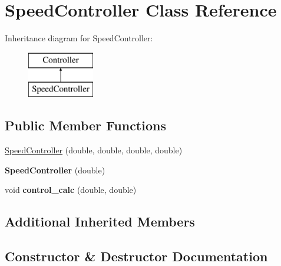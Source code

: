 \hypertarget{class_speed_controller}{}\section{Speed\+Controller Class Reference}
\label{class_speed_controller}
Inheritance diagram for Speed\+Controller\+:\begin{figure}[H]
\begin{center}
\leavevmode
\includegraphics[height=2.000000cm]{class_speed_controller}
\end{center}
\end{figure}
\subsection*{Public Member Functions}
\begin{DoxyCompactItemize}
\item 
\mbox{\hyperlink{class_speed_controller_ad29a7d6b879537f58853ef181454f14e}{Speed\+Controller}} (double, double, double, double)
\item 
\mbox{\label{class_speed_controller_af6392daf449e279179bdc9196e292574}} 
{\bfseries Speed\+Controller} (double)
\item 
\mbox{\label{class_speed_controller_ad6a1ec1441c1f4d005d668c20541cec1}} 
void {\bfseries control\+\_\+calc} (double, double)
\end{DoxyCompactItemize}
\subsection*{Additional Inherited Members}


\subsection{Constructor \& Destructor Documentation}
\mbox{\label{class_speed_controller_ad29a7d6b879537f58853ef181454f14e}} 
